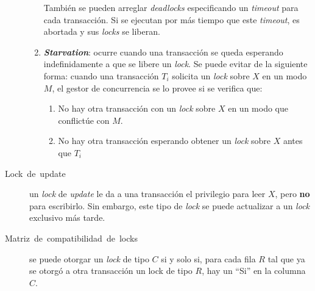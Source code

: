 \documentclass[a4paper, twoside]{article}
\begin{document}
\begin{description}
\begin{enumerate}
También se pueden arreglar \emph{deadlocks} especificando un \emph{timeout}
para cada transacción. Si se ejecutan por más tiempo que este \emph{timeout},
es abortada y sus \emph{locks} se liberan.

\item \textbf{\emph{Starvation}}: ocurre cuando una transacción se queda
esperando indefinidamente a que se libere un \emph{lock}. Se puede
evitar de la siguiente forma: cuando una transacción $T_{i}$ solicita
un \emph{lock} sobre $X$ en un modo $M$, el gestor de concurrencia
se lo provee si se verifica que:

\begin{enumerate}
\item No hay otra transacción con un \emph{lock }sobre $X$ en un modo que
conflictúe con $M$.
\item No hay otra transacción esperando obtener un \emph{lock }sobre $X$
antes que $T_{i}$
\end{enumerate}
\end{enumerate}
\item [{Lock~de~update}] un \emph{lock} de \emph{update} le da a una
transacción el privilegio para leer $X$, pero \textbf{no }para escribirlo.
Sin embargo, este tipo de \emph{lock }se puede actualizar a un \emph{lock}
exclusivo más tarde.
\item [{Matriz~de~compatibilidad~de~locks}] se puede otorgar un \emph{lock}
de tipo $C$ si y solo si, para cada fila $R$ tal que ya se otorgó
a otra transacción un lock de tipo $R$, hay un ``Si'' en la columna
$C$.
\end{description}
\end{document}

